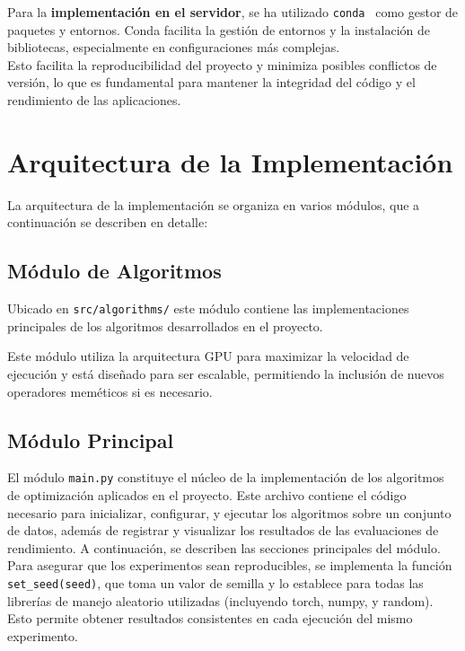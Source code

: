 Para la \textbf{implementación en el servidor}, se ha utilizado \texttt{conda}~\cite{noauthor_conda_nodate} como gestor
de paquetes y entornos.
Conda facilita la gestión de entornos y la instalación de bibliotecas, especialmente en configuraciones más complejas.
\\[6pt]

Esto facilita la reproducibilidad del proyecto y minimiza posibles conflictos de versión, lo que es fundamental para
mantener la integridad del código y el rendimiento de las aplicaciones.

\section{Arquitectura de la Implementación}\label{sec:arquitectura-de-la-implementacion}
La arquitectura de la implementación se organiza en varios módulos, que a continuación se describen en detalle:

\subsection{Módulo de Algoritmos}\label{subsec:modulo-de-algoritmos}
Ubicado en \texttt{src/algorithms/} este módulo contiene las implementaciones principales de los
algoritmos desarrollados en el proyecto.

Este módulo utiliza la arquitectura GPU para maximizar la velocidad de ejecución y está diseñado para ser escalable,
permitiendo la inclusión de nuevos operadores meméticos si es necesario.

\subsection{Módulo Principal}\label{subsec:modulo-principal}
El módulo \texttt{main.py} constituye el núcleo de la implementación de los algoritmos de optimización aplicados en el
proyecto.
Este archivo contiene el código necesario para inicializar, configurar, y ejecutar los algoritmos sobre un conjunto de
datos, además de registrar y visualizar los resultados de las evaluaciones de rendimiento.
A continuación, se describen las secciones principales del módulo. \\[6pt]

Para asegurar que los experimentos sean reproducibles, se implementa la función \texttt{set\_seed(seed)}, que toma un
valor de semilla y lo establece para todas las librerías de manejo aleatorio utilizadas (incluyendo torch, numpy, y
random).
Esto permite obtener resultados consistentes en cada ejecución del mismo experimento. \\[6pt]

